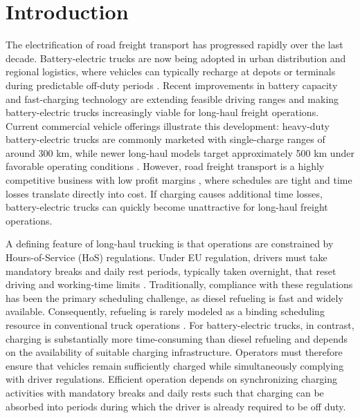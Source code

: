 \documentclass[3p,11pt,authoryear]{elsarticle}  %
\begin{document}
\section{Introduction}
\label{sec:Intro}


The electrification of road freight transport has progressed rapidly over the last decade. Battery-electric trucks are now being adopted in urban distribution and regional logistics, where vehicles can typically recharge at depots or terminals during predictable off-duty periods \citep{shoman2023battery}. Recent improvements in battery capacity and fast-charging technology are extending feasible driving ranges and making battery-electric trucks increasingly viable for long-haul freight operations. Current commercial vehicle offerings illustrate this development: heavy-duty battery-electric trucks are commonly marketed with single-charge ranges of around 300 km, while newer long-haul models target approximately 500 km under favorable operating conditions \citep{volvofhElectric,mercedesEactros600}. However, road freight transport is a highly competitive business with low profit margins \citep{eu2025roadcharges}, where schedules are tight and time losses translate directly into cost. If charging causes additional time losses,  battery-electric trucks can quickly become unattractive for long-haul freight operations.

A defining feature of long-haul trucking is that operations are constrained by Hours-of-Service (HoS) regulations. Under EU regulation, drivers must take mandatory breaks and daily rest periods, typically taken overnight, that reset driving and working-time limits \citep{goel2017exact}. Traditionally, compliance with these regulations has been the primary scheduling challenge, as diesel refueling is fast and widely available. Consequently, refueling is rarely modeled as a binding scheduling resource in conventional truck operations \citep{schulz2024ipc}. For battery-electric trucks, in contrast, charging is substantially more time-consuming than diesel refueling and depends on the availability of suitable charging infrastructure. Operators must therefore ensure that vehicles remain sufficiently charged while simultaneously complying with driver regulations. 
Efficient operation depends on synchronizing charging activities with mandatory breaks and daily rests such that charging can be absorbed into periods during which the driver is already required to be off duty. 
\end{document}
